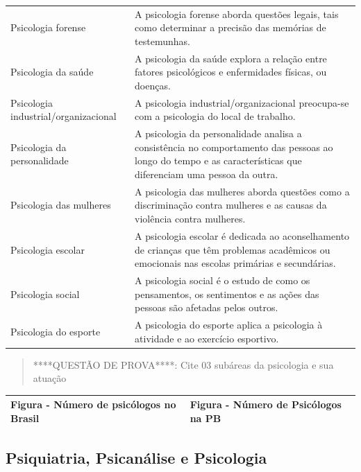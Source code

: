 \documentclass[
]{book}
\begin{document}
\begin{longtable}[]{@{}
  >{\raggedright\arraybackslash}p{}
  >{\raggedright\arraybackslash}p{}@{}}
Psicologia forense & A psicologia forense aborda questões legais, tais como determinar a precisão das memórias de testemunhas. \\
Psicologia da saúde & A psicologia da saúde explora a relação entre fatores psicológicos e enfermidades físicas, ou doenças. \\
Psicologia industrial/organizacional & A psicologia industrial/organizacional preocupa-se com a psicologia do local de trabalho. \\
Psicologia da personalidade & A psicologia da personalidade analisa a consistência no comportamento das pessoas ao longo do tempo e as características que diferenciam uma pessoa da outra. \\
Psicologia das mulheres & A psicologia das mulheres aborda questões como a discriminação contra mulheres e as causas da violência contra mulheres. \\
Psicologia escolar & A psicologia escolar é dedicada ao aconselhamento de crianças que têm problemas acadêmicos ou emocionais nas escolas primárias e secundárias. \\
Psicologia social & A psicologia social é o estudo de como os pensamentos, os sentimentos e as ações das pessoas são afetadas pelos outros. \\
Psicologia do esporte & A psicologia do esporte aplica a psicologia à atividade e ao exercício esportivo. \\
\bottomrule()
\end{longtable}

\begin{quote}
****QUESTÃO DE PROVA****: Cite 03 subáreas da psicologia e sua atuação
\end{quote}

\begin{longtable}[]{@{}
  >{\centering\arraybackslash}p{}
  >{\centering\arraybackslash}p{}@{}}
\toprule()
\endhead
Figura - Número de psicólogos no Brasil & Figura - Número de Psicólogos na PB \\
\bottomrule()
\end{longtable}

\hypertarget{psiquiatria-psicanuxe1lise-e-psicologia-1}{%
\subsection{Psiquiatria, Psicanálise e Psicologia}\label{psiquiatria-psicanuxe1lise-e-psicologia-1}}
\end{document}
